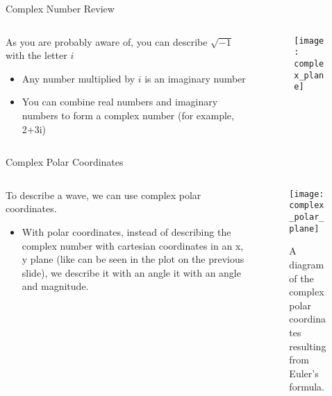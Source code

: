 \documentclass[aspectratio=169]{beamer}
\begin{document}
\begin{frame}[t]{Complex Number Review}
			
	\begin{columns}[c]
							
		\begin{column}{.5\textwidth}
			As you are probably aware of, you can describe $\sqrt{-1}$ with the letter $i$
			\begin{itemize}
				\item Any number multiplied by $i$ is an imaginary number
				\item You can combine real numbers and imaginary numbers to form a complex number (for example, 2+3i)
			\end{itemize}
		\end{column}
							
		\begin{column}{.5\textwidth}
			\begin{figure}
				\texttt{[image: complex\_plane]}
			\end{figure}
		\end{column}
							
	\end{columns}
				
\end{frame}


\begin{frame}[t]{Complex Polar Coordinates}
	
	\begin{columns}[c]
		
		\begin{column}{.5\textwidth}
			To describe a wave, we can use complex polar coordinates.
			\begin{itemize}
				\item With polar coordinates, instead of describing the complex number with cartesian coordinates in an x, y plane (like can be seen in the plot on the previous slide), we describe it with an angle it with an angle and magnitude.
			\end{itemize}
		\end{column}
						
		\begin{column}{.5\textwidth}
			\begin{figure}
				\texttt{[image: complex\_polar\_plane]}
				\caption{A diagram of the complex polar coordinates resulting from Euler's formula.}
			\end{figure}
		\end{column}
				
	\end{columns}
						
\end{frame}
\end{document}
